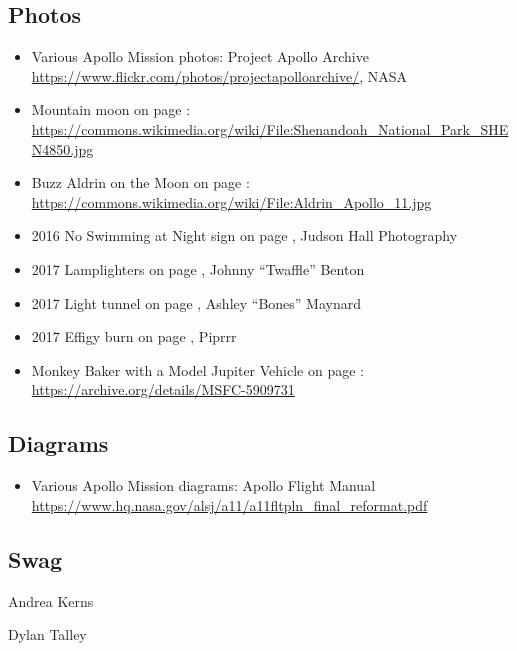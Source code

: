 \begin{multicols}{2}
\subsection*{Photos}
\begin{itemize}[noitemsep]
\item Various Apollo Mission photos: Project Apollo Archive \url{https://www.flickr.com/photos/projectapolloarchive/}, NASA
  \item Mountain moon on page \pageref{image:mountainmoom}: \url{https://commons.wikimedia.org/wiki/File:Shenandoah_National_Park_SHEN4850.jpg}
  \item Buzz Aldrin on the Moon on page \pageref{image:buzzaldrin}: \url{https://commons.wikimedia.org/wiki/File:Aldrin_Apollo_11.jpg}
\item 2016 No Swimming at Night sign on page \pageref{fig:2016riversafety}, Judson Hall Photography
\item 2017 Lamplighters on page \pageref{fig:lamplighters2017}, Johnny ``Twaffle'' Benton
\item 2017 Light tunnel on page \pageref{image:tunnel}, Ashley ``Bones'' Maynard
\item 2017 Effigy burn on page \pageref{image:2017effigyburn}, Piprrr
\item Monkey Baker with a Model Jupiter Vehicle on page \pageref{image:missbaker}: \url{https://archive.org/details/MSFC-5909731}
\end{itemize}


\subsection*{Diagrams}
\begin{itemize}[noitemsep]
\item Various Apollo Mission diagrams: Apollo Flight Manual \url{https://www.hq.nasa.gov/alsj/a11/a11fltpln_final_reformat.pdf}
\end{itemize}

\subsection*{Swag}

\begin{description}[leftmargin=6em,noitemsep,style=nextline]
	\item[Design:] Andrea Kerns
  \item[Creation:] Dylan Talley
\end{description}

\end{multicols}

